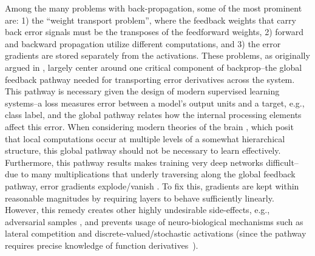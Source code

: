 \documentclass[letterpaper]{article} %
\begin{document}
Among the many problems with back-propagation, some of the most prominent are:
1) the ``weight transport problem'', where the feedback weights that carry back error signals must be the transposes of the feedforward weights, 2) forward and backward propagation utilize different computations, and 3) the error gradients are stored separately from the activations.
These problems, as originally argued in \cite{ororbia2017learning,ororbia2018conducting}, largely center around one critical component of backprop--the global feedback pathway needed for transporting error derivatives across the system. This pathway is necessary given the design of modern supervised learning systems--a loss measures error between a model's output units and a target, e.g., class label, and the global pathway relates how the internal processing elements affect this error.
When considering modern theories of the brain \cite{grossberg1982does,rao1999predictive,huang2011predictive}, which posit that local computations occur at multiple levels of a somewhat hierarchical structure, this global pathway should not be necessary to learn effectively. Furthermore, this pathway results makes training very deep networks difficult--due to many multiplications that underly traversing along the global feedback pathway, error gradients explode/vanish \cite{pascanu2013difficulty}. To fix this, gradients are kept within reasonable magnitudes by requiring layers to behave sufficiently linearly.
However, this remedy creates other highly undesirable side-effects, e.g., adversarial samples \cite{ororbia2017unifying}, and prevents usage of neuro-biological mechanisms such as lateral competition and discrete-valued/stochastic activations (since the pathway requires precise knowledge of function derivatives~\cite{bengio2015towards}).%
\end{document}
